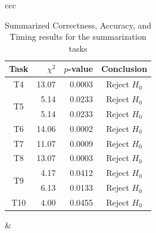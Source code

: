 \begin{table}[htpb]
  \centering
  \caption{Summarized Correctness, Accuracy, and Timing results for the summarization tasks}
  \label{tab:summarization_table}
  \begin{tabular}{ccc}
    \begin{tabular}{crrc}
      \toprule
      Task                  & $\chi^2$ & $p$-value  & Conclusion\\\midrule
      T4                    & 13.07    & 0.0003     & Reject $H_0$\\
      \multirow{2}{*}{T5}   & 5.14     & 0.0233     & Reject $H_0$\\
                            & 5.14     & 0.0233     & Reject $H_0$\\
      T6                    & 14.06    & 0.0002     & Reject $H_0$\\
      T7                    & 11.07    & 0.0009     & Reject $H_0$\\
      T8                    & 13.07    & 0.0003     & Reject $H_0$\\
      \multirow{2}{*}{T9}   & 4.17     & 0.0412     & Reject $H_0$\\
                            & 6.13     & 0.0133     & Reject $H_0$\\
      T10                   & 4.00     & 0.0455     & Reject $H_0$\\
      \bottomrule
    \end{tabular}
    &


\end{tabular}
\end{table}
